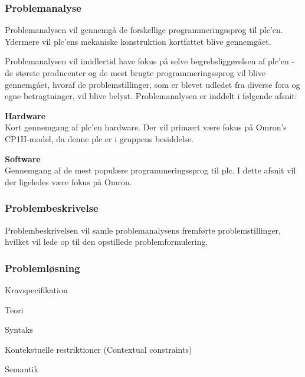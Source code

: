 \label{sec:rapportstruktur}


\subsubsection*{Problemanalyse}
Problemanalysen vil gennemgå de forskellige programmeringssprog til \gls{plc}'en. Ydermere vil \gls{plc}'ens mekaniske konstruktion kortfattet blive gennemgået. 

Problemanalysen vil imidlertid have fokus på selve begrebsliggørelsen af \gls{plc}'en - de største producenter og de mest brugte programmeringssprog vil blive gennemgået, hvoraf de problemstillinger, som er blevet udledet fra diverse fora og egne betragtninger, vil blive belyst. Problemanalysen er inddelt i følgende afsnit:

\begin{itemize_small}
    \item \textbf{Hardware} \\
    Kort gennemgang af \gls{plc}'en hardware. Der vil primært være fokus på Omron's CP1H-model, da denne \gls{plc} er i gruppens besiddelse.
    \item \textbf{Software} \\
    Gennemgang af de mest populære programmeringssprog til \gls{plc}. I dette afsnit vil der ligeledes være fokus på Omron.  
\end{itemize_small}

\subsubsection*{Problembeskrivelse}
Problembeskrivelsen vil samle problemanalysens fremførte problemstillinger, hvilket vil lede op til den opstillede problemformulering.

\subsubsection*{Problemløsning}

\begin{itemize_small}
    \item Kravspecifikation
    \item Teori
    \item Syntaks
    \item Kontekstuelle restriktioner (Contextual constraints)
    \item Semantik
\end{itemize_small}

